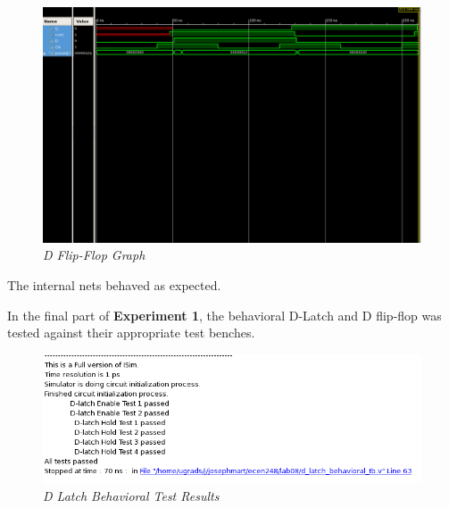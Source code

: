 \documentclass[a4paper,12pt]{article}
\begin{document}
  \newpage
  
  \begin{figure}[h]
    \begin{center}
      \includegraphics[scale=0.32]{Master_Slave_D_flip_flop_graph.png}
      \caption{\textit{D Flip-Flop Graph}}
    \end{center}
  \end{figure}
  
  The internal nets behaved as expected.
  
  In the final part of \textbf{Experiment 1}, the behavioral D-Latch and
  D flip-flop was tested against their appropriate test benches.

  \begin{figure}[h]
    \begin{center}
      \includegraphics[scale=0.6]{d_latch_Behavioral_tests.png}
      \caption{\textit{D Latch Behavioral Test Results}}
    \end{center}
  \end{figure}
  
  \newpage
  
\end{document}
